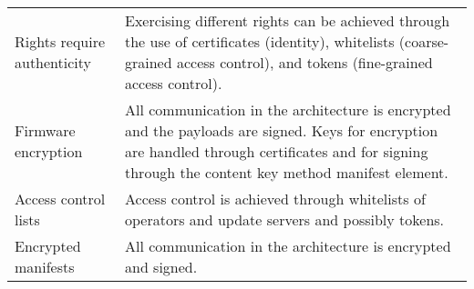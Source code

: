 \begin{longtable}[]{@{}ll@{}}
\begin{minipage}[t]{0.37\columnwidth}
Rights require authenticity\strut
\end{minipage} & \begin{minipage}[t]{0.57\columnwidth}\raggedright\strut
Exercising different rights can be achieved through the use of
certificates (identity), whitelists (coarse-grained access control), and
tokens (fine-grained access control).\strut
\end{minipage}\tabularnewline
\begin{minipage}[t]{0.37\columnwidth}\raggedright\strut
Firmware encryption\strut
\end{minipage} & \begin{minipage}[t]{0.57\columnwidth}\raggedright\strut
All communication in the architecture is encrypted and the payloads are
signed. Keys for encryption are handled through certificates and for
signing through the content key method manifest element.\strut
\end{minipage}\tabularnewline
\begin{minipage}[t]{0.37\columnwidth}\raggedright\strut
Access control lists\strut
\end{minipage} & \begin{minipage}[t]{0.57\columnwidth}\raggedright\strut
Access control is achieved through whitelists of operators and update
servers and possibly tokens.\strut
\end{minipage}\tabularnewline
\begin{minipage}[t]{0.37\columnwidth}\raggedright\strut
Encrypted manifests\strut
\end{minipage} & \begin{minipage}[t]{0.57\columnwidth}\raggedright\strut
All communication in the architecture is encrypted and signed.\strut
\end{minipage}\tabularnewline
\bottomrule
\end{longtable}
